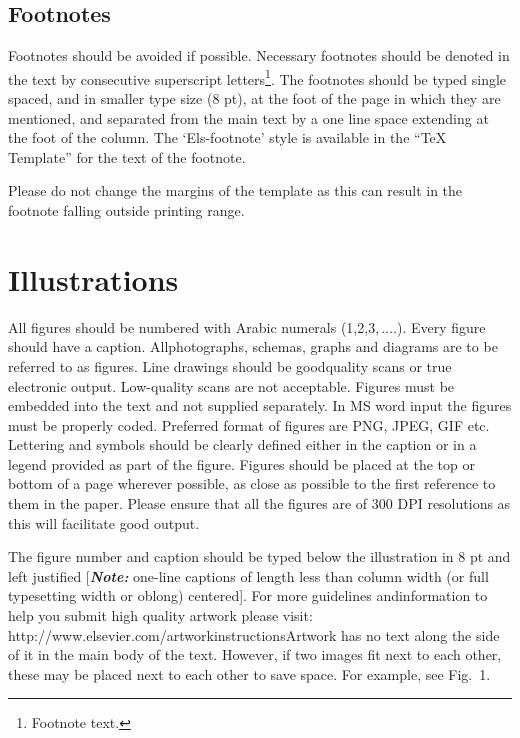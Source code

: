 \documentclass[5p,times,procedia]{elsarticle}
\begin{document}
\subsection{Footnotes}
Footnotes should be avoided if possible. Necessary footnotes should be denoted in the text by consecutive superscript letters\footnote{Footnote text.}. The footnotes should be typed single spaced, and in smaller type size (8 pt), at the foot of the page in which they are mentioned, and separated from the main text by a one line space extending at the foot of the column. The `Els-footnote' style is available in the ``TeX Template'' for the text of the footnote.

Please do not change the margins of the template as this can result in the footnote falling outside printing range.


\section{Illustrations}
All figures should be numbered with Arabic numerals (1,2,3,$\,\ldots.$). Every figure should have a caption. All\break photographs, schemas, graphs and diagrams are to be referred to as figures. Line drawings should be good\break quality scans or true electronic output. Low-quality scans are not acceptable. Figures must be embedded into the text and not supplied separately. In MS word input the figures must be properly coded. Preferred format of figures are PNG, JPEG, GIF etc. Lettering and symbols should be clearly defined either in the caption or in a legend provided as part of the figure. Figures should be placed at the top or bottom of a page wherever possible, as close as possible to the first reference to them in the paper. Please ensure that all the figures are of 300 DPI resolutions as this will facilitate good output.

The figure number and caption should be typed below the illustration in 8 pt and left justified [{\bfseries\itshape Note:} one-line captions of length less than column width (or full typesetting width or oblong) centered]. For more guidelines and\break information to help you submit high quality artwork please visit: http://www.elsevier.com/artworkinstructions\break Artwork has no text along the side of it in the main body of the text. However, if two images fit next to each other, these may be placed next to each other to save space. For example, see Fig.~1.
\end{document}
